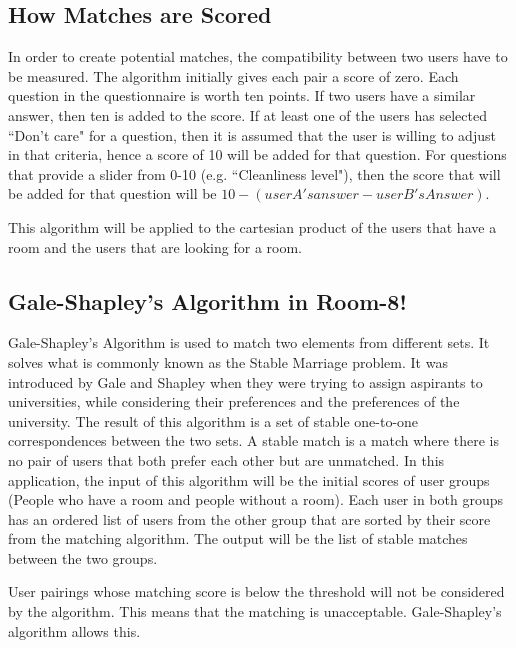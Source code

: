 \documentclass[journal]{./IEEE/IEEEtran}
\begin{document}
\subsection{How Matches are Scored}
In order to create potential matches, the compatibility between two users have to be measured. The algorithm initially
gives each pair a score of zero. Each question in the questionnaire is worth ten points. If two users have a similar
answer, then ten is added to the score. If at least one of the users has selected ``Don't care" for a question, then it
is assumed that the user is willing to adjust in that criteria, hence a score of 10 will be added for that question. For
questions that provide a slider from 0-10 (e.g. ``Cleanliness level"), then the score that will be added for that
question will be $10 - (user A's answer - user B's Answer)$.

This algorithm will be applied to the cartesian product of the users that have a room and the users that are looking for
a room.

\subsection{Gale-Shapley's Algorithm in Room-8!}
Gale-Shapley's Algorithm is used to match two elements from different sets. It solves what is commonly known as the
Stable Marriage problem. It was introduced by Gale and Shapley when they were trying to assign aspirants to
universities, while considering their preferences and the preferences of the university\cite{irving}. The result of this
algorithm is a set of stable one-to-one correspondences between the two sets. A stable match is a match where there is
no pair of users that both prefer each other but are unmatched\cite{marriage}. In this application, the input of this
algorithm will be the initial scores of user groups (People who have a room and people without a room). Each user in
both groups has an ordered list of users from the other group that are sorted by their score from the matching
algorithm. The output will be the list of stable matches between the two groups.

User pairings whose matching score is below the threshold will not be considered by the algorithm. This means that the
matching is unacceptable. Gale-Shapley's algorithm allows this\cite{marriage}.




\end{document}
